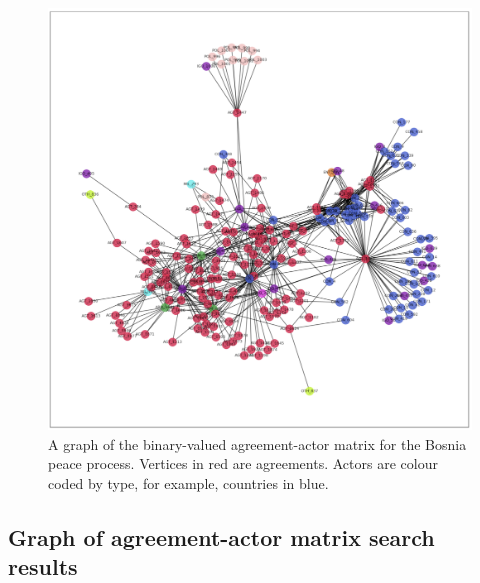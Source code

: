 \documentclass{article}
\begin{document}
\begin{figure}[H]
\begin{center}
\includegraphics[scale=0.50]{./assets/bosnia_process.png}
\end{center}
\caption{A graph of the binary-valued agreement-actor matrix for the Bosnia peace process. Vertices in red are agreements. Actors are colour coded by type, for example, countries in blue.}
\end{figure}

\subsection{Graph of agreement-actor matrix search results}
\end{document}
